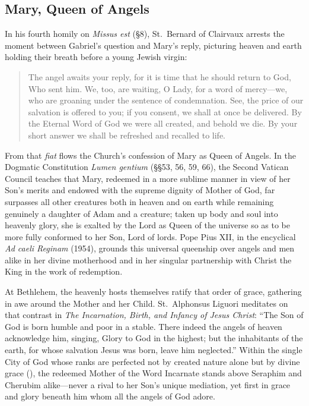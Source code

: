 \subsection{Mary, Queen of Angels}

In his fourth homily on \emph{Missus est} (\S8), St.~Bernard of Clairvaux arrests the moment between Gabriel's question and Mary's reply, picturing heaven and earth holding their breath before a young Jewish virgin:

\begin{quotation}
The angel awaits your reply, for it is time that he should return to God, Who sent him. We, too, are waiting, O Lady, for a word of mercy---we, who are groaning under the sentence of condemnation. See, the price of our salvation is offered to you; if you consent, we shall at once be delivered. By the Eternal Word of God we were all created, and behold we die. By your short answer we shall be refreshed and recalled to life.
\end{quotation}

From that \emph{fiat} flows the Church's confession of Mary as Queen of Angels. In the Dogmatic Constitution \emph{Lumen gentium} (\S\S53, 56, 59, 66), the Second Vatican Council teaches that Mary, redeemed in a more sublime manner in view of her Son's merits and endowed with the supreme dignity of Mother of God, far surpasses all other creatures both in heaven and on earth while remaining genuinely a daughter of Adam and a creature; taken up body and soul into heavenly glory, she is exalted by the Lord as Queen of the universe so as to be more fully conformed to her Son, Lord of lords. Pope Pius XII, in the encyclical \emph{Ad caeli Reginam} (1954), grounds this universal queenship over angels and men alike in her divine motherhood and in her singular partnership with Christ the King in the work of redemption.

At Bethlehem, the heavenly hosts themselves ratify that order of grace, gathering in awe around the Mother and her Child. St.~Alphonsus Liguori meditates on that contrast in \emph{The Incarnation, Birth, and Infancy of Jesus Christ}: ``The Son of God is born humble and poor in a stable. There indeed the angels of heaven acknowledge him, singing, Glory to God in the highest; but the inhabitants of the earth, for whose salvation Jesus was born, leave him neglected.'' Within the single City of God whose ranks are perfected not by created nature alone but by divine grace (), the redeemed Mother of the Word Incarnate stands above Seraphim and Cherubim alike---never a rival to her Son's unique mediation, yet first in grace and glory beneath him whom all the angels of God adore.

